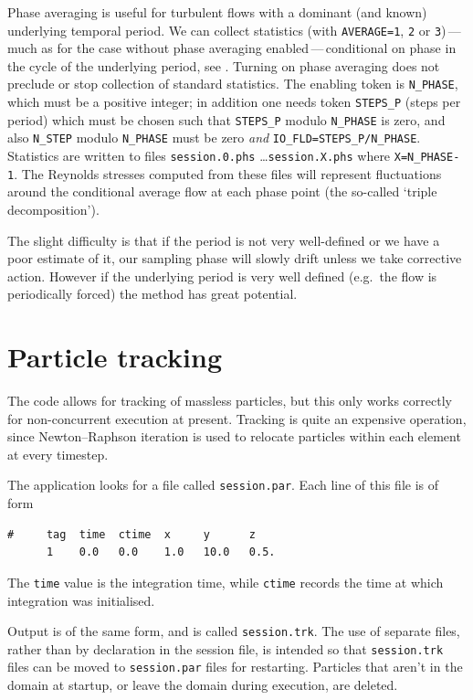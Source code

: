 \documentclass[11pt]{report}
\newcommand{\eg}{e.g.\ } \newcommand{\CC}{\mathrm{c.c.}}
\begin{document}
Phase averaging is useful for turbulent flows with a dominant (and
known) underlying temporal period.  We can collect statistics (with
\verb|AVERAGE=1|, \verb|2| or \verb|3|)\,---\,much as for the case
without phase averaging enabled\,---\,conditional on phase in the
cycle of the underlying period, see \citet{rehu72}.  Turning
on phase averaging does not preclude or stop collection of standard
statistics.  The enabling token is \verb|N_PHASE|, which must be a
positive integer; in addition one needs token \verb|STEPS_P| (steps
per period) which must be chosen such that \verb|STEPS_P| modulo
\verb|N_PHASE| is zero, and also \verb|N_STEP| modulo \verb|N_PHASE|
must be zero \emph{and} \verb|IO_FLD=STEPS_P/N_PHASE|.  Statistics are
written to files \verb|session.0.phs| \ldots \verb|session.X.phs|
where \verb|X=N_PHASE-1|.  The Reynolds stresses computed from these
files will represent fluctuations around the conditional average flow
at each phase point (the so-called `triple decomposition').

The slight difficulty is that if the period is not very well-defined
or we have a poor estimate of it, our sampling phase will slowly drift
unless we take corrective action.  However if the underlying period is
very well defined (\eg the flow is periodically forced) the method has
great potential.

\section{Particle tracking}
\label{sec.particle}

The code allows for tracking of massless particles, but this only
works correctly for non-concurrent execution at present.  Tracking is
quite an expensive operation, since Newton--Raphson iteration is used
to relocate particles within each element at every timestep.

The application looks for a file called \verb+session.par+.  Each line
of this file is of form
\begin{verbatim}
#     tag  time  ctime  x     y      z
      1    0.0   0.0    1.0   10.0   0.5.
\end{verbatim}
The \verb+time+ value is the integration time, while \verb+ctime+
records the time at which integration was initialised.

Output is of the same form, and is called \verb+session.trk+.  The use
of separate files, rather than by declaration in the session file, is
intended so that \verb+session.trk+ files can be moved to
\verb+session.par+ files for restarting.  Particles that aren't in the
domain at startup, or leave the domain during execution, are deleted.
\end{document}
